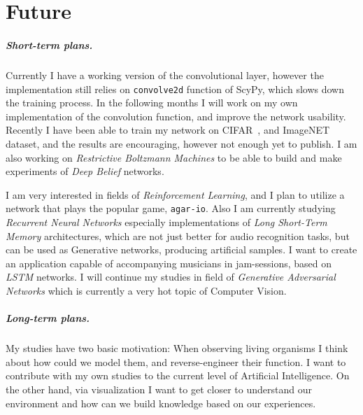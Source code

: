 \chapter{Future}

\paragraph{Short-term plans.} 
Currently I have a working version of the convolutional layer, 
however the implementation still relies on \texttt{convolve2d} function of ScyPy, which slows down the training process.
In the following months I will work on my own implementation of the convolution function, 
and improve the network usability.
Recently I have been able to train my network on CIFAR~\cite{cifar}, and ImageNET~\cite{deng2009imagenet} dataset, and the results are encouraging, however not enough yet to publish.
I am also working on \emph{Restrictive Boltzmann Machines} to be able to build and make experiments of \emph{Deep Belief} networks.

I am very interested in fields of \emph{Reinforcement Learning}, 
and I plan to utilize a network that plays the popular game, \texttt{agar-io}.
Also I am currently studying \emph{Recurrent Neural Networks} especially implementations of \emph{Long Short-Term Memory} architectures, 
which are not just better for audio recognition tasks, but can be used as Generative networks, producing artificial samples.
I want to create an application capable of accompanying musicians in jam-sessions, based on \emph{LSTM} networks.
I will continue my studies in field of \emph{Generative Adversarial Networks} which is currently a very hot topic of Computer Vision.

\paragraph{Long-term plans.}
My studies have two basic motivation:
When observing living organisms I think about how could we model them, 
and reverse-engineer their function.
I want to contribute with my own studies to the current level of Artificial Intelligence.
On the other hand, via visualization I want to get closer to understand our 
environment and how can we build knowledge based on our experiences.
